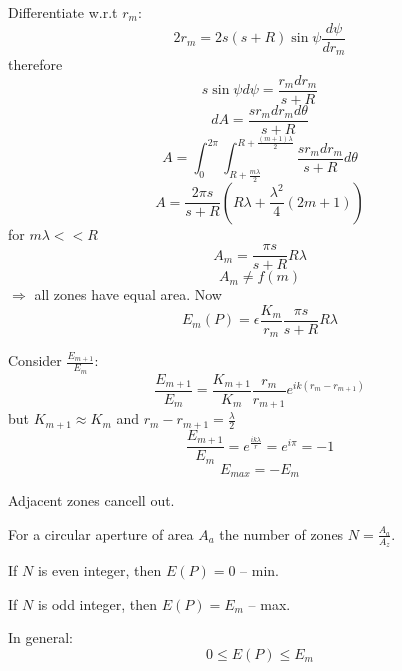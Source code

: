 \documentclass[10pt]{article}
\begin{document}
Differentiate w.r.t $r_m$:
\begin{equation*}
2r_m = 2s(s + R)\sin{\psi}\frac{d\psi}{dr_m}
\end{equation*}
therefore
\begin{equation*}
s \sin{\psi} d\psi = \frac{r_m dr_m}{s+R}
\end{equation*}
\begin{equation*}
dA = \frac{sr_m d r_m d \theta}{s+R}
\end{equation*}
\begin{equation*}
A = \int_0^{2\pi} \int_{R + \frac{m \lambda}{2}}^{R + \frac{(m+1) \lambda}{2}} \frac{sr_m d r_m}{s+R}d\theta
\end{equation*}
\begin{equation*}
A = \frac{2 \pi s}{s+R} \left(R\lambda +\frac{\lambda^2}{4}(2m +1)\right)
\end{equation*}
for $m \lambda << R$
\begin{equation}\boxed{
A_m = \frac{\pi s}{s+R}R\lambda
}\end{equation}
\begin{equation*}
A_m \neq f(m) 
\end{equation*}
$\Rightarrow$ all zones have equal area. Now
\begin{equation*}
E_m(P) = \epsilon \frac{K_m}{r_m}\frac{\pi s}{s + R}R \lambda
\end{equation*}

Consider $\frac{E_{m+1}}{E_m}$:
\begin{equation*}
\frac{E_{m+1}}{E_m} = \frac{K_{m+1}}{K_m} \frac{r_m}{r_{m+1}}e^{ik(r_m - r_{m+1})}
\end{equation*}
but $K_{m+1} \approx K_m$ and $r_m - r_{m+1} = \frac{\lambda}{2}$
\begin{equation*}
\frac{E_{m+1}}{E_m} = e^{\frac{ik\lambda}{r}} = e^{i\pi} = -1
\end{equation*}
\begin{equation*}
E_{max} = - E_m
\end{equation*}

Adjacent zones cancell out.

For a circular aperture of area $A_a$ the number of zones $N = \frac{A_a}{A_z}$.

If $N$ is even integer, then $E(P) = 0$ -- min.

If $N$ is odd integer, then $E(P) = E_m$ -- max.

In general:
\begin{equation*}
0 \leq E(P) \leq E_m
\end{equation*}
\end{document}
